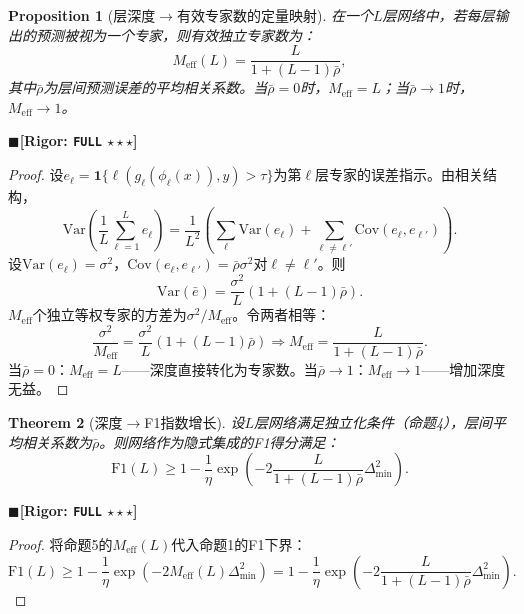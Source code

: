 \documentclass[12pt,a4paper]{ctexart}
\newtheorem{theorem}{Theorem}[section]
\newtheorem{proposition}[theorem]{Proposition}
\theoremstyle{definition}
\theoremstyle{remark}
\newcommand{\rigorFull}{$\blacksquare$\;\textbf{[Rigor: \texttt{FULL} $\star\star\star$]}}
\begin{document}
\begin{proposition}[层深度$\to$有效专家数的定量映射]
\label{prop:5}
在一个$L$层网络中，若每层输出的预测被视为一个专家，则有效独立专家数为：
\begin{equation}
M_{\text{eff}}(L) = \frac{L}{1 + (L-1)\bar{\rho}},
\end{equation}
其中$\bar{\rho}$为层间预测误差的平均相关系数。当$\bar{\rho} = 0$时，$M_{\text{eff}} = L$；当$\bar{\rho} \to 1$时，$M_{\text{eff}} \to 1$。
\end{proposition}
\rigorFull

\begin{proof}
设$e_\ell = \mathbf{1}\{\ell(g_\ell(\phi_\ell(x)), y) > \tau\}$为第$\ell$层专家的误差指示。由相关结构，
\begin{equation}
\mathrm{Var}\left(\frac{1}{L}\sum_{\ell=1}^L e_\ell\right) = \frac{1}{L^2}\left(\sum_\ell \mathrm{Var}(e_\ell) + \sum_{\ell \neq \ell'} \mathrm{Cov}(e_\ell, e_{\ell'})\right).
\end{equation}
设$\mathrm{Var}(e_\ell) = \sigma^2$，$\mathrm{Cov}(e_\ell, e_{\ell'}) = \bar{\rho}\sigma^2$对$\ell \neq \ell'$。则
\begin{equation}
\mathrm{Var}(\bar{e}) = \frac{\sigma^2}{L}(1 + (L-1)\bar{\rho}).
\end{equation}
$M_{\text{eff}}$个独立等权专家的方差为$\sigma^2/M_{\text{eff}}$。令两者相等：
\begin{equation}
\frac{\sigma^2}{M_{\text{eff}}} = \frac{\sigma^2}{L}(1 + (L-1)\bar{\rho}) \Rightarrow M_{\text{eff}} = \frac{L}{1 + (L-1)\bar{\rho}}.
\end{equation}
当$\bar{\rho} = 0$：$M_{\text{eff}} = L$——深度直接转化为专家数。当$\bar{\rho} \to 1$：$M_{\text{eff}} \to 1$——增加深度无益。
\end{proof}

\begin{theorem}[深度$\to$F1指数增长]
\label{thm:3.1}
设$L$层网络满足独立化条件（命题4），层间平均相关系数为$\bar{\rho}$。则网络作为隐式集成的F1得分满足：
\begin{equation}
\boxed{\mathrm{F1}(L) \geq 1 - \frac{1}{\eta}\exp\left(-2\frac{L}{1 + (L-1)\bar{\rho}}\Delta_{\min}^2\right)}.
\end{equation}
\end{theorem}
\rigorFull

\begin{proof}
将命题5的$M_{\text{eff}}(L)$代入命题1的F1下界：
\begin{equation}
\mathrm{F1}(L) \geq 1 - \frac{1}{\eta}\exp(-2M_{\text{eff}}(L)\Delta_{\min}^2) = 1 - \frac{1}{\eta}\exp\left(-2\frac{L}{1 + (L-1)\bar{\rho}}\Delta_{\min}^2\right).
\end{equation}
\end{proof}
\end{document}
